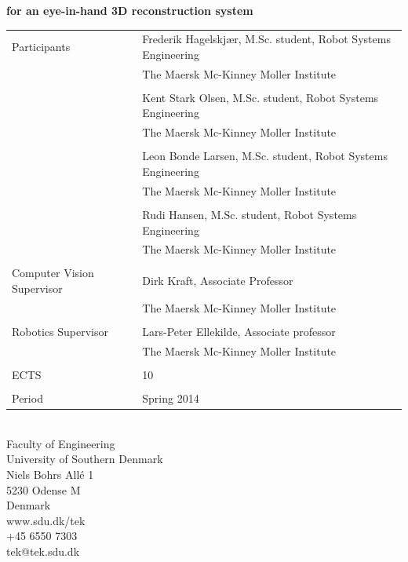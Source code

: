 \begin{titlepage}
\textsf{\Large{\textbf{\textcolor{FrontpageHeadingColor}{for an eye-in-hand 3D reconstruction system}}}}\\
\vspace{1.0cm}
\setlength{\extrarowheight}{1.5pt}
\begin{tabular}{@{}l l}
	\textsf{\large{Participants}} & \textsf{\large{Frederik Hagelskjær, M.Sc. student, Robot Systems Engineering}}\\
	& \textsf{\large{The Maersk Mc-Kinney Moller Institute}}\\
	\\
	& \textsf{\large{Kent Stark Olsen, M.Sc. student, Robot Systems Engineering}}\\
	& \textsf{\large{The Maersk Mc-Kinney Moller Institute}}\\
	\\
	& \textsf{\large{Leon Bonde Larsen, M.Sc. student, Robot Systems Engineering}}\\
	& \textsf{\large{The Maersk Mc-Kinney Moller Institute}}\\
	\\
	& \textsf{\large{Rudi Hansen, M.Sc. student, Robot Systems Engineering}}\\
	& \textsf{\large{The Maersk Mc-Kinney Moller Institute}}\\
	\\
	\textsf{\large{Computer Vision Supervisor}} & \textsf{\large{Dirk Kraft, Associate Professor}}\\
	& \textsf{\large{The Maersk Mc-Kinney Moller Institute}}\\
	\\
	\textsf{\large{Robotics Supervisor}} & \textsf{\large{Lars-Peter Ellekilde, Associate professor}}\\
	& \textsf{\large{The Maersk Mc-Kinney Moller Institute}}\\
	\\
	\textsf{\large{ECTS}} & \textsf{\large{10}}\\
	\\
	\textsf{\large{Period}} & \textsf{\large{Spring 2014}}
\end{tabular}
\vfill
\textsf{\\Faculty of Engineering\\
University of Southern Denmark\\
Niels Bohrs Allé 1\\
5230 Odense M\\
Denmark}
\vspace*{10pt}
\\
\textsf{www.sdu.dk/tek\\
+45 6550 7303\\
tek@tek.sdu.dk}
\end{titlepage}